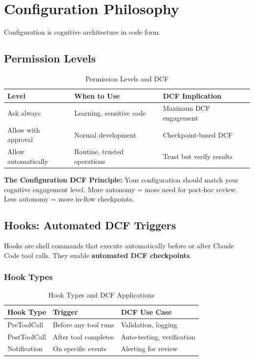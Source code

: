 \chapter{Configuration Philosophy}

Configuration is cognitive architecture in code form.

\section{Permission Levels}

\begin{table}[H]
\centering
\begin{tabular}{lll}
\toprule
\textbf{Level} & \textbf{When to Use} & \textbf{DCF Implication} \\
\midrule
Ask always & Learning, sensitive code & Maximum DCF engagement \\
Allow with approval & Normal development & Checkpoint-based DCF \\
Allow automatically & Routine, trusted operations & Trust but verify results \\
\bottomrule
\end{tabular}
\caption{Permission Levels and DCF}
\end{table}

\textbf{The Configuration DCF Principle:} Your configuration should match your cognitive engagement level. More autonomy = more need for post-hoc review. Less autonomy = more in-flow checkpoints.

\section{Hooks: Automated DCF Triggers}\label{sec:hooks}

Hooks are shell commands that execute automatically before or after Claude Code tool calls. They enable \textbf{automated DCF checkpoints}.

\subsection{Hook Types}

\begin{table}[H]
\centering
\begin{tabular}{lll}
\toprule
\textbf{Hook Type} & \textbf{Trigger} & \textbf{DCF Use Case} \\
\midrule
PreToolCall & Before any tool runs & Validation, logging \\
PostToolCall & After tool completes & Auto-testing, verification \\
Notification & On specific events & Alerting for review \\
\bottomrule
\end{tabular}
\caption{Hook Types and DCF Applications}
\end{table}

